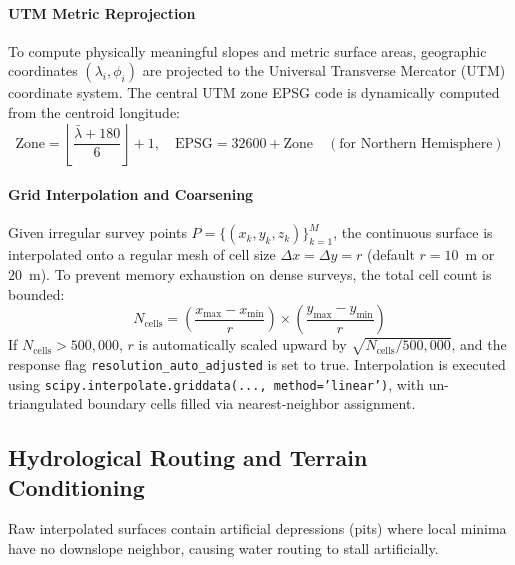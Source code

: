\documentclass[manuscript,screen,review]{acmart}
\begin{document}
\paragraph{UTM Metric Reprojection}
To compute physically meaningful slopes and metric surface areas, geographic coordinates
$(\lambda_i, \phi_i)$ are projected to the Universal Transverse Mercator (UTM) coordinate system.
The central UTM zone EPSG code is dynamically computed from the centroid longitude:
\begin{equation}
  \text{Zone} = \left\lfloor \frac{\bar{\lambda} + 180}{6} \right\rfloor + 1, \quad
  \text{EPSG} = 32600 + \text{Zone} \quad (\text{for Northern Hemisphere})
\end{equation}

\paragraph{Grid Interpolation and Coarsening}
Given irregular survey points $P = \{(x_k, y_k, z_k)\}_{k=1}^M$, the continuous surface is
interpolated onto a regular mesh of cell size $\Delta x = \Delta y = r$ (default $r = 10$~m or $20$~m).
To prevent memory exhaustion on dense surveys, the total cell count is bounded:
\begin{equation}
  N_{\text{cells}} = \left( \frac{x_{\max} - x_{\min}}{r} \right) \times \left( \frac{y_{\max} - y_{\min}}{r} \right)
\end{equation}
If $N_{\text{cells}} > 500{,}000$, $r$ is automatically scaled upward by $\sqrt{N_{\text{cells}} / 500{,}000}$,
and the response flag \texttt{resolution\_auto\_adjusted} is set to true.
Interpolation is executed using \texttt{scipy.interpolate.griddata(..., method='linear')},
with un-triangulated boundary cells filled via nearest-neighbor assignment.

\subsection{Hydrological Routing and Terrain Conditioning}

Raw interpolated surfaces contain artificial depressions (pits) where local minima have no downslope
neighbor, causing water routing to stall artificially.
\end{document}
